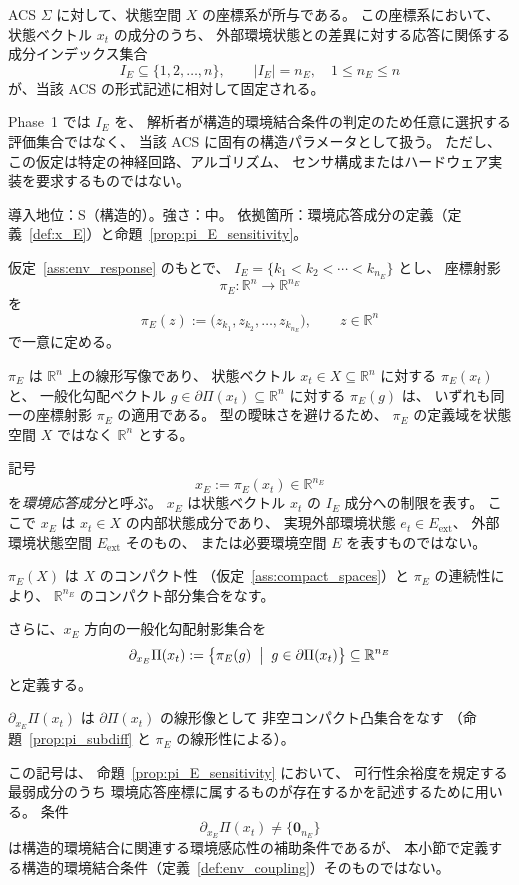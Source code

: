 \begin{assumption}[環境応答成分の構造的決定]
\label{ass:env_response}
ACS $\Sigma$ に対して、状態空間 $X$ の座標系が所与である。
この座標系において、状態ベクトル $x_t$ の成分のうち、
外部環境状態との差異に対する応答に関係する成分インデックス集合
\[
  I_E\subseteq\{1,2,\ldots,n\},
  \qquad
  |I_E|=n_E,\quad
  1\le n_E\le n
\]
が、当該 ACS の形式記述に相対して固定される。

Phase~1 では $I_E$ を、
解析者が構造的環境結合条件の判定のため任意に選択する評価集合ではなく、
当該 ACS に固有の構造パラメータとして扱う。
ただし、この仮定は特定の神経回路、アルゴリズム、
センサ構成またはハードウェア実装を要求するものではない。

導入地位：S（構造的）。強さ：中。
依拠箇所：環境応答成分の定義（定義~\ref{def:x_E}）と命題~\ref{prop:pi_E_sensitivity}。
\end{assumption}

\begin{definition}
\label{def:x_E}
仮定~\ref{ass:env_response} のもとで、
$I_E=\{k_1<k_2<\cdots<k_{n_E}\}$ とし、
座標射影
\[
  \pi_E:\mathbb{R}^n\to\mathbb{R}^{n_E}
\]
を
\[
  \pi_E(z)
  :=
  \bigl(
    z_{k_1},
    z_{k_2},
    \ldots,
    z_{k_{n_E}}
  \bigr),
  \qquad
  z\in\mathbb{R}^n
\]
で一意に定める。

$\pi_E$ は $\mathbb{R}^n$ 上の線形写像であり、
状態ベクトル
$x_t\in X\subseteq\mathbb{R}^n$
に対する $\pi_E(x_t)$ と、
一般化勾配ベクトル
$g\in\partial\Pi(x_t)\subseteq\mathbb{R}^n$
に対する $\pi_E(g)$ は、
いずれも同一の座標射影 $\pi_E$ の適用である。
型の曖昧さを避けるため、
$\pi_E$ の定義域を状態空間 $X$ ではなく
$\mathbb{R}^n$ とする。

記号
\[
  x_E:=\pi_E(x_t)\in\mathbb{R}^{n_E}
\]
を\emph{環境応答成分}と呼ぶ。
$x_E$ は状態ベクトル $x_t$ の
$I_E$ 成分への制限を表す。
ここで $x_E$ は $x_t\in X$ の内部状態成分であり、
実現外部環境状態 $e_t\in E_{\mathrm{ext}}$、
外部環境状態空間 $E_{\mathrm{ext}}$ そのもの、
または必要環境空間 $E$ を表すものではない。

$\pi_E(X)$ は $X$ のコンパクト性
（仮定~\ref{ass:compact_spaces}）と
$\pi_E$ の連続性により、
$\mathbb{R}^{n_E}$ のコンパクト部分集合をなす。

さらに、$x_E$ 方向の一般化勾配射影集合を
\[
  \partial_{x_E}\Pi(x_t)
  :=
  \bigl\{
    \pi_E(g)
    \;\bigm|\;
    g\in\partial\Pi(x_t)
  \bigr\}
  \subseteq
  \mathbb{R}^{n_E}
\]
と定義する。

$\partial_{x_E}\Pi(x_t)$ は
$\partial\Pi(x_t)$ の線形像として
非空コンパクト凸集合をなす
（命題~\ref{prop:pi_subdiff} と
$\pi_E$ の線形性による）。

この記号は、
命題~\ref{prop:pi_E_sensitivity} において、
可行性余裕度を規定する最弱成分のうち
環境応答座標に属するものが存在するかを記述するために用いる。
条件
\[
  \partial_{x_E}\Pi(x_t)
  \neq
  \{\mathbf{0}_{n_E}\}
\]
は構造的環境結合に関連する環境感応性の補助条件であるが、
本小節で定義する構造的環境結合条件（定義~\ref{def:env_coupling}）そのものではない。
\end{definition}

